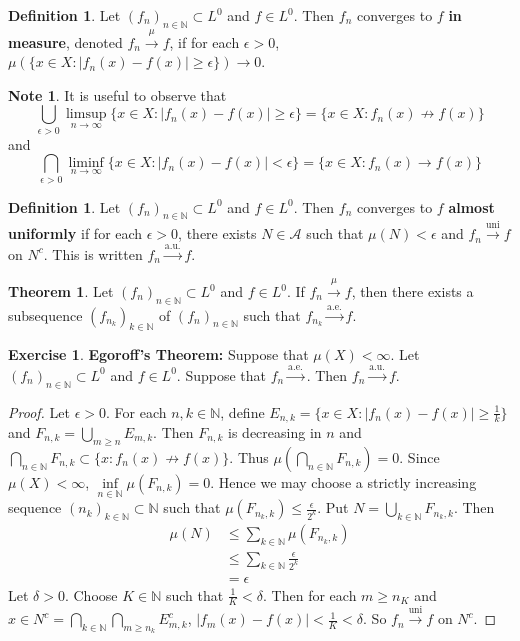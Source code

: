 \documentclass[12pt]{amsart}
\theoremstyle{definition}
\newtheorem{defn}[definition]{Definition}
\newtheorem{note}[definition]{Note}
\newtheorem{thm}[definition]{Theorem}
\newtheorem{ex}[definition]{Exercise}
\newcommand{\del}{\delta}
\newcommand{\ep}{\epsilon}
\newcommand{\N}{\mathbb{N}}
\newcommand{\MA}{\mathcal{A}}
\newcommand{\convt}[1]{\xrightarrow{\text{#1}}}
\begin{document}
	\begin{defn}
		Let $(f_n)_{n \in \N} \subset L^0$ and $f \in L^0$. Then $f_n$ converges to $f$ \textbf{in measure}, denoted $f_n \xrightarrow{\mu} f$, if for each $\ep > 0$, $\mu(\{x \in X: |f_n(x) - f(x)| \geq \ep \}) \rightarrow 0$.
	\end{defn}
	
	\begin{note}
		It is useful to observe that $$\bigcup_{\ep >0}\limsup\limits_{n \rightarrow \infty} \{x \in X: |f_n(x) - f(x)| \geq \ep \} = \{x \in X: f_n(x) \not \rightarrow f(x) \}$$ and $$\bigcap_{\ep > 0} \liminf_{n \rightarrow \infty}\{x \in X: |f_n(x) - f(x)| < \ep \} = \{x \in X: f_n(x) \rightarrow f(x) \}$$ 
	\end{note}
	
	\begin{defn}
		Let $(f_n)_{n \in \N} \subset L^0$ and $f \in L^0$. Then $f_n$ converges to $f$ \textbf{almost uniformly} if for each $\ep >0$, there exists $N \in \MA$ such that $\mu(N) < \ep$ and $f_n \xrightarrow{\text{uni}} f$ on $N^c$. This is written $f_n \xrightarrow{\text{a.u.}} f$.
	\end{defn}
	
	\begin{thm}
		Let $(f_n)_{n \in \N} \subset L^0$ and $f \in L^0$. If $f_n \xrightarrow{\mu} f$, then there exists a subsequence $(f_{n_k})_{k \in \N}$ of $(f_n)_{n \in \N}$ such that $f_{n_k} \xrightarrow{\text{a.e.}} f$.
	\end{thm}
	
	\begin{ex}\textbf{Egoroff's Theorem:}
		Suppose that $\mu(X) < \infty$. Let $(f_n)_{n \in \N} \subset L^0$ and $f \in L^0$. Suppose that $f_n \xrightarrow{\text{a.e.}}$. Then $f_n \xrightarrow{\text{a.u.}}f$.
	\end{ex}
	
	\begin{proof}
		Let $\ep >0$. For each $n, k \in \N$, define $E_{n, k} = \{x \in X: \vert f_n(x) - f(x) \vert \geq \frac{1}{k} \}$ and $F_{n,k} = \bigcup\limits_{m \geq n}E_{m,k}$. Then $F_{n,k}$ is decreasing in $n$ and $\bigcap\limits_{n \in \N}F_{n,k} \subset \{x: f_n(x) \not \rightarrow f(x)\}$. Thus $\mu(\bigcap\limits_{n \in \N}F_{n,k}) = 0$. Since $\mu(X) < \infty$, $\inf\limits_{n \in \N}\mu(F_{n,k}) = 0$. Hence we may choose a strictly increasing sequence $(n_k)_{k \in \N} \subset \N$ such that  $\mu(F_{n_k,k}) \leq \frac{\ep}{2^{k}}$. Put $N = \bigcup\limits_{k \in \N}F_{n_k,k}$. Then 
		\begin{align*}
			\mu(N) 
			&\leq \sum\limits_{k \in \N}\mu(F_{n_k,k}) \\
			& \leq \sum\limits_{k \in \N} \frac{\ep}{2^k}\\
			& = \ep
		\end{align*} 
		Let $\del > 0$. Choose $K \in \N$ such that $\frac{1}{K} < \del$. Then for each $m \geq n_K$ and $x \in N^c =\bigcap\limits_{k \in \N}\bigcap\limits_{m \geq n_k}E_{m,k}^c$, $|f_m(x)- f(x)| < \frac{1}{K} < \del$. So $f_n \convt{uni} f$ on $N^c$. 
	\end{proof}
	
\end{document}
